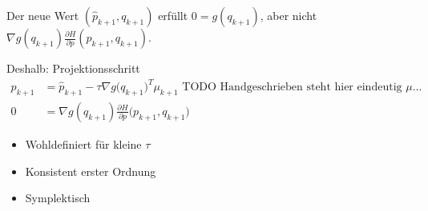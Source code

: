 Der neue Wert $(\hat p_{k+1}, q_{k+1})$ erfüllt $0 = g(q_{k+1})$, aber nicht $\nabla g(q_{k+1}) \frac{\partial H}{\partial p}(p_{k+1}, q_{k+1})$.

Deshalb: Projektionsschritt
\begin{align*}
p_{k+1} & = \hat p_{k+1} - \tau \nabla g \big(q_{k+1}\big)^T \mu_{k+1}\text{  TODO Handgeschrieben steht hier eindeutig $\mu$...}
\\
0 & = \nabla g (q_{k+1}) \frac{\partial H}{\partial p} \Big(p_{k+1}, q_{k+1}\Big)
\end{align*}
\begin{itemize}
\item Wohldefiniert für kleine $\tau$
\item Konsistent erster Ordnung
\item Symplektisch
\end{itemize}
